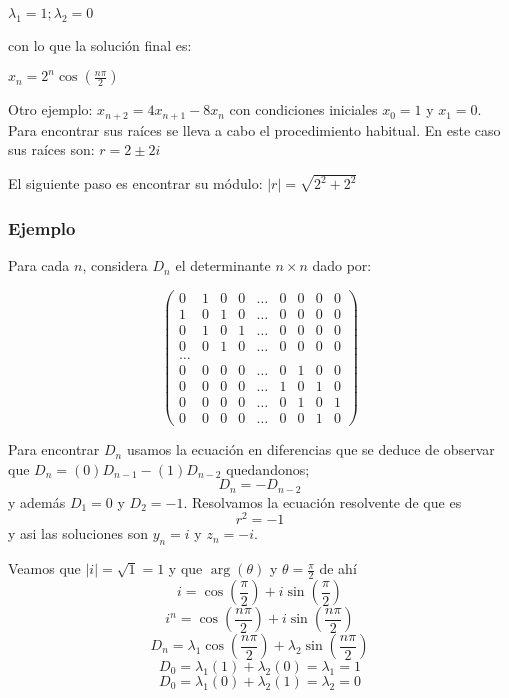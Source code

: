 \documentclass{article}
\begin{document}
$\lambda_1=1;\lambda_2=0$

con lo que la solución final es:

$x_n=2^n\cos(\frac{n\pi}{2})$

Otro ejemplo: $x_{n+2}=4x_{n+1}-8x_n$ con condiciones iniciales
$x_0=1$ y $x_1=0$. Para encontrar sus raíces se lleva a cabo el
procedimiento habitual. En este caso sus raíces son: $r=2\pm2i$

El siguiente paso es encontrar su módulo: $|r|=\sqrt{2^2+2^2}$


\subsubsection{Ejemplo}

Para cada $n$, considera $D_{n}$ el determinante $n\times n$ dado por:

\begin{equation*}
\begin{pmatrix}
0 & 1 & 0 & 0 &\ldots & 0 & 0 & 0 & 0\\
1 & 0 & 1 & 0 &\ldots & 0 & 0 & 0 & 0\\
0 & 1 & 0 & 1 &\ldots & 0 & 0 & 0 & 0\\
0 & 0 & 1 & 0 &\ldots & 0 & 0 & 0 & 0\\
\ldots\\
0 & 0 & 0 & 0 &\ldots & 0 & 1 & 0 & 0\\
0 & 0 & 0 & 0 &\ldots & 1 & 0 & 1 & 0\\
0 & 0 & 0 & 0 &\ldots & 0 & 1 & 0 & 1\\
0 & 0 & 0 & 0 &\ldots & 0 & 0 & 1 & 0
\end{pmatrix}
\end{equation*}


Para encontrar $D_{n}$ usamos la ecuación en diferencias que se deduce de observar
que $D_{n}=(0)D_{n-1}-(1)D_{n-2}$ quedandonos;
\begin{equation}
  \label{determinante}
D_{n}=-D_{n-2}
\end{equation}
 y además $D_{1}=0$ y $D_{2}=-1$.
Resolvamos la ecuación resolvente de que es $$r^{2}=-1$$ y asi las soluciones son $y_{n}=i$ y  $z_{n}=-i$.

Veamos que  $|i|=\sqrt{1}=1$ y que $\arg(\theta)$ y $\theta= \frac{\pi}{2}$ de ahí
  $$i=\cos(\frac{\pi}{2})+i\sin(\frac{\pi}{2})$$
  $$i^n=\cos(\frac{n\pi}{2})+i\sin(\frac{n\pi}{2})$$
  $$D_{n}=\lambda_{1}\cos(\frac{n\pi}{2})+\lambda_{2}\sin(\frac{n\pi}{2})$$
  $$D_{0}=\lambda_{1}(1)+\lambda_{2}(0)=\lambda_{1}=1$$
  $$D_{0}=\lambda_{1}(0)+\lambda_{2}(1)=\lambda_{2}=0$$
\end{document}
